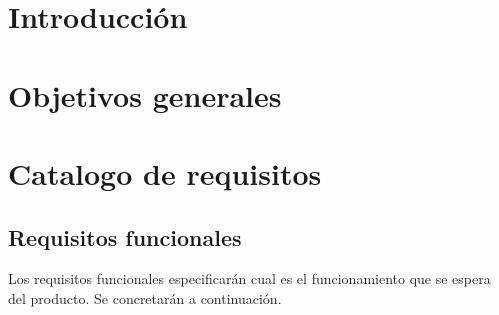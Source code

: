 
\section{Introducción}

\section{Objetivos generales}

\section{Catalogo de requisitos}
\subsection{Requisitos funcionales}
Los requisitos funcionales especificarán cual es el funcionamiento que se espera del producto. Se concretarán a continuación.

